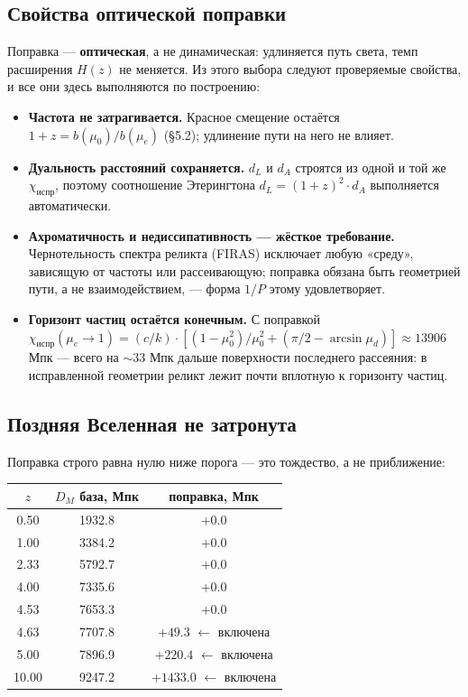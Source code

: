 \documentclass{article}
\begin{document}
\subsection{Свойства оптической поправки}

Поправка --- \textbf{оптическая}, а не динамическая: удлиняется путь света, темп расширения $H(z)$ не меняется. Из этого выбора следуют проверяемые свойства, и все они здесь выполняются по построению:
\begin{itemize}
  \item \textbf{Частота не затрагивается.} Красное смещение остаётся $1+z = b(\mu_0)/b(\mu_e)$ (\S5.2); удлинение пути на него не влияет.
  \item \textbf{Дуальность расстояний сохраняется.} $d_L$ и $d_A$ строятся из одной и той же $\chi_{\text{испр}}$, поэтому соотношение Этерингтона $d_L = (1+z)^2\cdot d_A$ выполняется автоматически.
  \item \textbf{Ахроматичность и недиссипативность --- жёсткое требование.} Чернотельность спектра реликта (FIRAS) исключает любую «среду», зависящую от частоты или рассеивающую; поправка обязана быть геометрией пути, а не взаимодействием, --- форма $1/P$ этому удовлетворяет.
  \item \textbf{Горизонт частиц остаётся конечным.} С поправкой $\chi_{\text{испр}}(\mu_e \to 1) = (c/k)\cdot[(1-\mu_0^2)/\mu_0^2 + (\pi/2 - \arcsin\mu_d)] \approx 13906$ Мпк --- всего на ${\sim}33$ Мпк дальше поверхности последнего рассеяния: в исправленной геометрии реликт лежит почти вплотную к горизонту частиц.
\end{itemize}

\subsection{Поздняя Вселенная не затронута}

Поправка строго равна нулю ниже порога --- это тождество, а не приближение:

\begin{table}[htbp]
\centering
\small
\begin{tabular}{@{}ccc@{}}
\toprule
$z$ & $D_M$ база, Мпк & поправка, Мпк \\
\midrule
0.50 & 1932.8 & $+0.0$ \\
1.00 & 3384.2 & $+0.0$ \\
2.33 & 5792.7 & $+0.0$ \\
4.00 & 7335.6 & $+0.0$ \\
4.53 & 7653.3 & $+0.0$ \\
4.63 & 7707.8 & $+49.3$ $\leftarrow$ включена \\
5.00 & 7896.9 & $+220.4$ $\leftarrow$ включена \\
10.00 & 9247.2 & $+1433.0$ $\leftarrow$ включена \\
\bottomrule
\end{tabular}
\end{table}
\end{document}
